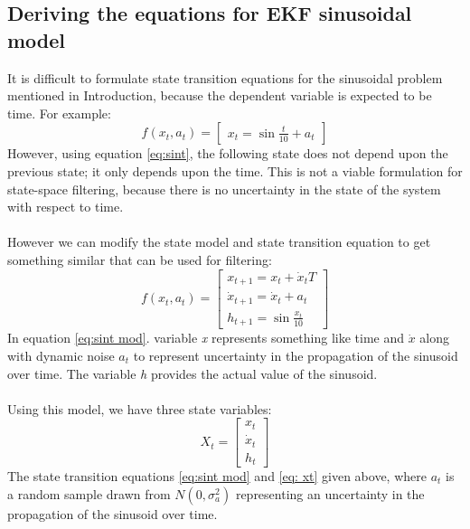 \documentclass[12pt]{article}
\begin{document}
\subsection{Deriving the equations for EKF sinusoidal model}
\label{sec: derivation}
It is difficult to formulate state transition equations for the sinusoidal problem mentioned in Introduction, because the dependent variable is expected to be time. For example: 
\begin{equation}
f(x_t,a_t) = \begin{bmatrix}
x_t = \sin \frac{t}{10} + a_t
\label{eq:sint}
\end{bmatrix}
\end{equation}
However, using equation \ref{eq:sint}, the following state does not depend upon the previous state; it only depends upon the time. This is not a viable formulation for state-space filtering, because there is no uncertainty in the state of the system with respect to time. \\
\\ \indent
However we can modify the state model and state transition equation to get something similar that can be used for filtering:
\begin{equation}
f(x_t,a_t) = \begin{bmatrix}
x_{t+1} = x_t + \dot{x}_t T \\
\dot{x}_{t+1} = \dot{x}_t + a_t \\
h_{t+1} = \sin \frac{x_t}{10}
\end{bmatrix}
\label{eq:sint mod}
\end{equation}
In equation \ref{eq:sint mod}. variable \textit{x} represents something like time and $\dot{x}$ along with dynamic noise $a_t$ to represent uncertainty in the propagation of the sinusoid over time. The variable \textit{h} provides the actual value of the sinusoid. \\
\\ \indent
Using this model, we have three state variables:
\begin{equation}
X_t = \begin{bmatrix}
x_t \\
\dot{x}_t \\
h_t
\end{bmatrix}
\label{eq: xt}
\end{equation}
The state transition equations \ref{eq:sint mod} and \ref{eq: xt} given above, where $a_t$ is a random sample drawn from $N(0,\sigma_a^2)$ representing an uncertainty in the propagation of the sinusoid over time. \\
\end{document}
